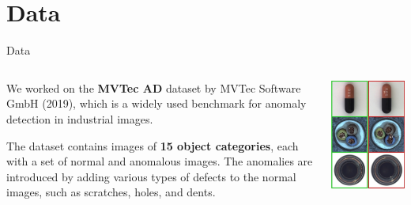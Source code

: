 \documentclass{beamer}
\begin{document}
\section{Data}
\begin{frame}{Data}
\begin{columns}
\begin{column}{0.7\textwidth}
      We worked on the \textbf{MVTec AD} dataset by MVTec Software GmbH (2019), which is a
       widely used benchmark for anomaly detection in industrial images.\newline

        The dataset contains images of \textbf{15 object categories}, each with a
         set of normal and anomalous images.
          The anomalies are introduced by adding various types of defects to the
           normal images, such as scratches, holes, and dents.
\end{column}
           \begin{column}{0.3\textwidth}
            \includegraphics[width=\textwidth]
            {assets/mvtec}
            \end{column}
            \end{columns}
                  
\end{frame}
\end{document}
